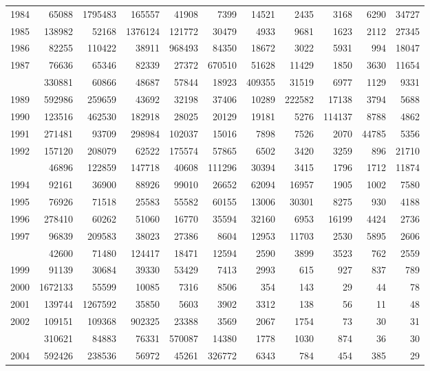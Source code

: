 \documentclass[
]{article}
\begin{document}
\begin{longtable}[t]{lrrrrrrrrrr}
1984 & 65088 & 1795483 & 165557 & 41908 & 7399 & 14521 & 2435 & 3168 & 6290 & 34727\\
1985 & 138982 & 52168 & 1376124 & 121772 & 30479 & 4933 & 9681 & 1623 & 2112 & 27345\\
1986 & 82255 & 110422 & 38911 & 968493 & 84350 & 18672 & 3022 & 5931 & 994 & 18047\\
1987 & 76636 & 65346 & 82339 & 27372 & 670510 & 51628 & 11429 & 1850 & 3630 & 11654\\
\addlinespace
1988 & 330881 & 60866 & 48687 & 57844 & 18923 & 409355 & 31519 & 6977 & 1129 & 9331\\
1989 & 592986 & 259659 & 43692 & 32198 & 37406 & 10289 & 222582 & 17138 & 3794 & 5688\\
1990 & 123516 & 462530 & 182918 & 28025 & 20129 & 19181 & 5276 & 114137 & 8788 & 4862\\
1991 & 271481 & 93709 & 298984 & 102037 & 15016 & 7898 & 7526 & 2070 & 44785 & 5356\\
1992 & 157120 & 208079 & 62522 & 175574 & 57865 & 6502 & 3420 & 3259 & 896 & 21710\\
\addlinespace
1993 & 46896 & 122859 & 147718 & 40608 & 111296 & 30394 & 3415 & 1796 & 1712 & 11874\\
1994 & 92161 & 36900 & 88926 & 99010 & 26652 & 62094 & 16957 & 1905 & 1002 & 7580\\
1995 & 76926 & 71518 & 25583 & 55582 & 60155 & 13006 & 30301 & 8275 & 930 & 4188\\
1996 & 278410 & 60262 & 51060 & 16770 & 35594 & 32160 & 6953 & 16199 & 4424 & 2736\\
1997 & 96839 & 209583 & 38023 & 27386 & 8604 & 12953 & 11703 & 2530 & 5895 & 2606\\
\addlinespace
1998 & 42600 & 71480 & 124417 & 18471 & 12594 & 2590 & 3899 & 3523 & 762 & 2559\\
1999 & 91139 & 30684 & 39330 & 53429 & 7413 & 2993 & 615 & 927 & 837 & 789\\
2000 & 1672133 & 55599 & 10085 & 7316 & 8506 & 354 & 143 & 29 & 44 & 78\\
2001 & 139744 & 1267592 & 35850 & 5603 & 3902 & 3312 & 138 & 56 & 11 & 48\\
2002 & 109151 & 109368 & 902325 & 23388 & 3569 & 2067 & 1754 & 73 & 30 & 31\\
\addlinespace
2003 & 310621 & 84883 & 76331 & 570087 & 14380 & 1778 & 1030 & 874 & 36 & 30\\
2004 & 592426 & 238536 & 56972 & 45261 & 326772 & 6343 & 784 & 454 & 385 & 29\\

\end{longtable}
\end{document}
